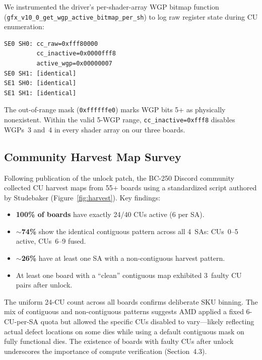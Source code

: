 \documentclass[11pt,twocolumn]{article}
\begin{document}
We instrumented the driver's per-shader-array WGP bitmap function (\texttt{gfx\_v10\_0\_get\_wgp\_active\_bitmap\-\_per\_sh}) to log raw register state during CU enumeration:

\begin{lstlisting}
SE0 SH0: cc_raw=0xfff80000
         cc_inactive=0x0000fff8
         active_wgp=0x00000007
SE0 SH1: [identical]
SE1 SH0: [identical]
SE1 SH1: [identical]
\end{lstlisting}

The out-of-range mask (\texttt{0xffffffe0}) marks WGP bits 5+ as physically nonexistent. Within the valid 5-WGP range, \texttt{cc\_inactive=0xfff8} disables WGPs~3 and~4 in every shader array on our three boards.

\subsection{Community Harvest Map Survey}

Following publication of the unlock patch, the BC-250 Discord community collected CU harvest maps from 55+ boards using a standardized script authored by Studebaker (Figure~\ref{fig:harvest}). Key findings:

\begin{itemize}[nosep]
    \item \textbf{100\% of boards} have exactly 24/40 CUs active (6 per SA).
    \item \textbf{$\sim$74\%} show the identical contiguous pattern across all 4~SAs: CUs~0--5 active, CUs~6--9 fused.
    \item \textbf{$\sim$26\%} have at least one SA with a non-contiguous harvest pattern.
    \item At least one board with a ``clean'' contiguous map exhibited 3~faulty CU pairs after unlock.
\end{itemize}

The uniform 24-CU count across all boards confirms deliberate SKU binning. The mix of contiguous and non-contiguous patterns suggests AMD applied a fixed 6-CU-per-SA quota but allowed the specific CUs disabled to vary---likely reflecting actual defect locations on some dies while using a default contiguous mask on fully functional dies. The existence of boards with faulty CUs after unlock underscores the importance of compute verification (Section~4.3).
\end{document}
